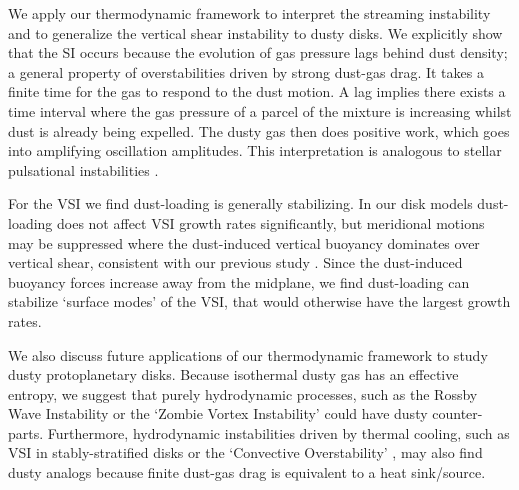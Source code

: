 We  apply our thermodynamic framework to interpret
the streaming instability \citep[SI, ][]{youdin05a,jacquet11} and to generalize the vertical shear
instability \citep[VSI, ][]{nelson13,lin15} to dusty disks. We
explicitly show that the SI occurs because the evolution of gas
pressure lags behind  dust density; a general property of 
overstabilities driven by strong dust-gas drag. 
It takes a finite time for the gas to respond to
the dust motion. A lag implies there exists a time interval where 
the gas pressure of a parcel of the mixture is increasing whilst dust is already being expelled.  
The dusty gas then does positive work, which goes into amplifying
oscillation amplitudes. This interpretation is analogous to stellar pulsational
instabilities \citep{cox67}. 

For the VSI we find dust-loading is generally stabilizing. In our disk models 
dust-loading does not affect VSI growth rates significantly, but
meridional motions may be suppressed where the dust-induced
vertical buoyancy dominates over vertical shear, consistent with our
previous study \citep{lin15}. Since the dust-induced buoyancy forces increase away from the midplane, we find dust-loading can stabilize `surface modes' of the VSI, that would otherwise have the largest growth rates.  

We also discuss future applications of our thermodynamic framework to 
study dusty protoplanetary disks. Because isothermal dusty gas has an
effective entropy, we suggest that purely hydrodynamic processes, such
as the Rossby Wave Instability \citep{li00} or the `Zombie Vortex
Instability' \citep{marcus15} could have dusty counter-parts.   
Furthermore, hydrodynamic instabilities driven by thermal cooling, such as VSI in
stably-stratified disks \citep{lin15} or the `Convective
Overstability' \citep{klahr14, lyra14},  may also find dusty analogs 
because finite dust-gas drag is equivalent to a heat sink/source. 






 
